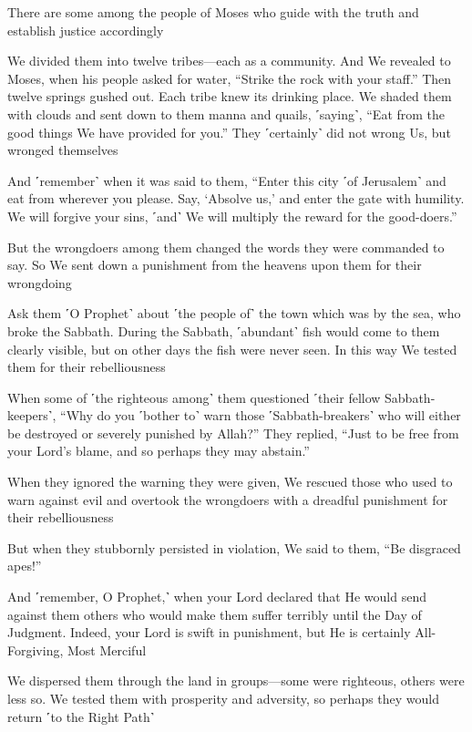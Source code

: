 There are some among the people of Moses who guide with the truth and establish justice accordingly

We divided them into twelve tribes—each as a community. And We revealed to Moses, when his people asked for water, “Strike the rock with your staff.” Then twelve springs gushed out. Each tribe knew its drinking place. We shaded them with clouds and sent down to them manna and quails, ˹saying˺, “Eat from the good things We have provided for you.” They ˹certainly˺ did not wrong Us, but wronged themselves

And ˹remember˺ when it was said to them, “Enter this city ˹of Jerusalem˺ and eat from wherever you please. Say, ‘Absolve us,’ and enter the gate with humility. We will forgive your sins, ˹and˺ We will multiply the reward for the good-doers.”

But the wrongdoers among them changed the words they were commanded to say. So We sent down a punishment from the heavens upon them for their wrongdoing

Ask them ˹O Prophet˺ about ˹the people of˺ the town which was by the sea, who broke the Sabbath. During the Sabbath, ˹abundant˺ fish would come to them clearly visible, but on other days the fish were never seen. In this way We tested them for their rebelliousness

When some of ˹the righteous among˺ them questioned ˹their fellow Sabbath-keepers˺, “Why do you ˹bother to˺ warn those ˹Sabbath-breakers˺ who will either be destroyed or severely punished by Allah?” They replied, “Just to be free from your Lord’s blame, and so perhaps they may abstain.”

When they ignored the warning they were given, We rescued those who used to warn against evil and overtook the wrongdoers with a dreadful punishment for their rebelliousness

But when they stubbornly persisted in violation, We said to them, “Be disgraced apes!”

And ˹remember, O Prophet,˺ when your Lord declared that He would send against them others who would make them suffer terribly until the Day of Judgment. Indeed, your Lord is swift in punishment, but He is certainly All-Forgiving, Most Merciful

We dispersed them through the land in groups—some were righteous, others were less so. We tested them with prosperity and adversity, so perhaps they would return ˹to the Right Path˺


